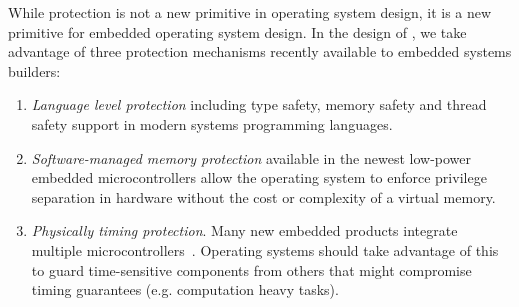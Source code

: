 
While protection is not a new primitive in operating system design, it is a
new primitive for embedded operating system design. In the design of \name, we
take advantage of three protection mechanisms recently available to embedded
systems builders:

\begin{enumerate}
  \item \emph{Language level protection} including type safety, memory safety
    and thread safety support in modern systems programming languages.
  \item \emph{Software-managed memory protection} available in the newest
    low-power embedded microcontrollers allow the operating system to enforce
    privilege separation in hardware without the cost or complexity of a virtual
    memory.
  \item \emph{Physically timing protection}. Many new embedded products
    integrate multiple microcontrollers~.
  Operating systems should take advantage of this to guard time-sensitive
  components from others that might compromise timing guarantees (e.g.
  computation heavy tasks).
\end{enumerate}

